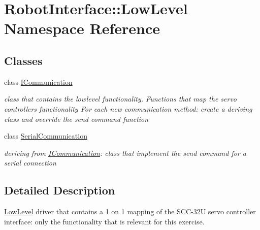 \hypertarget{namespaceRobotInterface_1_1LowLevel}{}\section{Robot\+Interface\+:\+:Low\+Level Namespace Reference}
\label{namespaceRobotInterface_1_1LowLevel}
\subsection*{Classes}
\begin{DoxyCompactItemize}
\item 
class \hyperlink{classRobotInterface_1_1LowLevel_1_1ICommunication}{I\+Communication}
\begin{DoxyCompactList}\small\item\em class that contains the lowlevel functionality. Functions that map the servo controller\textquotesingle{}s functionality For each new communication method\+: create a deriving class and override the send command function \end{DoxyCompactList}\item 
class \hyperlink{classRobotInterface_1_1LowLevel_1_1SerialCommunication}{Serial\+Communication}
\begin{DoxyCompactList}\small\item\em deriving from \hyperlink{classRobotInterface_1_1LowLevel_1_1ICommunication}{I\+Communication}\+: class that implement the send command for a serial connection \end{DoxyCompactList}\end{DoxyCompactItemize}


\subsection{Detailed Description}
\hyperlink{namespaceRobotInterface_1_1LowLevel}{Low\+Level} driver that contains a 1 on 1 mapping of the S\+C\+C-\/32U servo controller interface\+: only the functionality that is relevant for this exercise. 